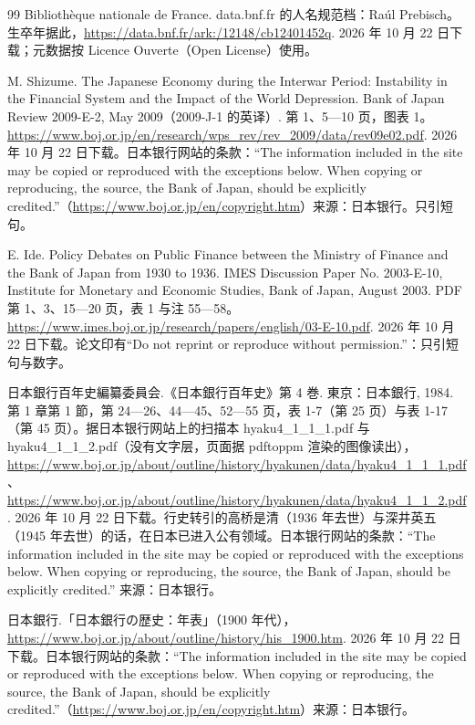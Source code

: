 \begin{thebibliography}{99}
 Bibliothèque nationale de France. data.bnf.fr 的人名规范档：Raúl Prebisch。生卒年据此，\url{https://data.bnf.fr/ark:/12148/cb12401452q}. 2026 年 10 月 22 日下载；元数据按 Licence Ouverte（Open License）使用。

 M. Shizume. The Japanese Economy during the Interwar Period: Instability in the Financial System and the Impact of the World Depression. Bank of Japan Review 2009-E-2, May 2009（2009-J-1 的英译）. 第 1、5—10 页，图表 1。\url{https://www.boj.or.jp/en/research/wps_rev/rev_2009/data/rev09e02.pdf}. 2026 年 10 月 22 日下载。日本银行网站的条款：“The information included in the site may be copied or reproduced with the exceptions below. When copying or reproducing, the source, the Bank of Japan, should be explicitly credited.”（\url{https://www.boj.or.jp/en/copyright.htm}）来源：日本银行。只引短句。

 E. Ide. Policy Debates on Public Finance between the Ministry of Finance and the Bank of Japan from 1930 to 1936. IMES Discussion Paper No. 2003-E-10, Institute for Monetary and Economic Studies, Bank of Japan, August 2003. PDF 第 1、3、15—20 页，表 1 与注 55—58。\url{https://www.imes.boj.or.jp/research/papers/english/03-E-10.pdf}. 2026 年 10 月 22 日下载。论文印有“Do not reprint or reproduce without permission.”：只引短句与数字。

 日本銀行百年史編纂委員会.《日本銀行百年史》第 4 巻. 東京：日本銀行, 1984. 第 1 章第 1 節，第 24—26、44—45、52—55 页，表 1-7（第 25 页）与表 1-17（第 45 页）。据日本银行网站上的扫描本 hyaku4\_1\_1\_1.pdf 与 hyaku4\_1\_1\_2.pdf（没有文字层，页面据 pdftoppm 渲染的图像读出），\url{https://www.boj.or.jp/about/outline/history/hyakunen/data/hyaku4_1_1_1.pdf}、\url{https://www.boj.or.jp/about/outline/history/hyakunen/data/hyaku4_1_1_2.pdf}. 2026 年 10 月 22 日下载。行史转引的高桥是清（1936 年去世）与深井英五（1945 年去世）的话，在日本已进入公有领域。日本银行网站的条款：“The information included in the site may be copied or reproduced with the exceptions below. When copying or reproducing, the source, the Bank of Japan, should be explicitly credited.” 来源：日本银行。

 日本銀行.「日本銀行の歴史：年表」（1900 年代），\url{https://www.boj.or.jp/about/outline/history/his_1900.htm}. 2026 年 10 月 22 日下载。日本银行网站的条款：“The information included in the site may be copied or reproduced with the exceptions below. When copying or reproducing, the source, the Bank of Japan, should be explicitly credited.”（\url{https://www.boj.or.jp/en/copyright.htm}）来源：日本银行。


\end{thebibliography}
